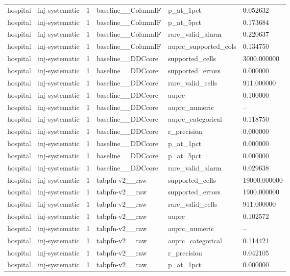 \begin{tabular}{llllll}
hospital & inj-systematic & 1 & baseline\_\_ColumnIF & p\_at\_1pct & 0.052632 \\
hospital & inj-systematic & 1 & baseline\_\_ColumnIF & p\_at\_5pct & 0.173684 \\
hospital & inj-systematic & 1 & baseline\_\_ColumnIF & rare\_valid\_alarm & 0.220637 \\
hospital & inj-systematic & 1 & baseline\_\_ColumnIF & auprc\_supported\_cols & 0.134750 \\
hospital & inj-systematic & 1 & baseline\_\_DDCcore & supported\_cells & 3000.000000 \\
hospital & inj-systematic & 1 & baseline\_\_DDCcore & supported\_errors & 0.000000 \\
hospital & inj-systematic & 1 & baseline\_\_DDCcore & rare\_valid\_cells & 911.000000 \\
hospital & inj-systematic & 1 & baseline\_\_DDCcore & auprc & 0.100000 \\
hospital & inj-systematic & 1 & baseline\_\_DDCcore & auprc\_numeric & -- \\
hospital & inj-systematic & 1 & baseline\_\_DDCcore & auprc\_categorical & 0.118750 \\
hospital & inj-systematic & 1 & baseline\_\_DDCcore & r\_precision & 0.000000 \\
hospital & inj-systematic & 1 & baseline\_\_DDCcore & p\_at\_1pct & 0.000000 \\
hospital & inj-systematic & 1 & baseline\_\_DDCcore & p\_at\_5pct & 0.000000 \\
hospital & inj-systematic & 1 & baseline\_\_DDCcore & rare\_valid\_alarm & 0.029638 \\
hospital & inj-systematic & 1 & tabpfn-v2\_\_raw & supported\_cells & 19000.000000 \\
hospital & inj-systematic & 1 & tabpfn-v2\_\_raw & supported\_errors & 1900.000000 \\
hospital & inj-systematic & 1 & tabpfn-v2\_\_raw & rare\_valid\_cells & 911.000000 \\
hospital & inj-systematic & 1 & tabpfn-v2\_\_raw & auprc & 0.102572 \\
hospital & inj-systematic & 1 & tabpfn-v2\_\_raw & auprc\_numeric & -- \\
hospital & inj-systematic & 1 & tabpfn-v2\_\_raw & auprc\_categorical & 0.114421 \\
hospital & inj-systematic & 1 & tabpfn-v2\_\_raw & r\_precision & 0.042105 \\
hospital & inj-systematic & 1 & tabpfn-v2\_\_raw & p\_at\_1pct & 0.000000 \\

\end{tabular}

